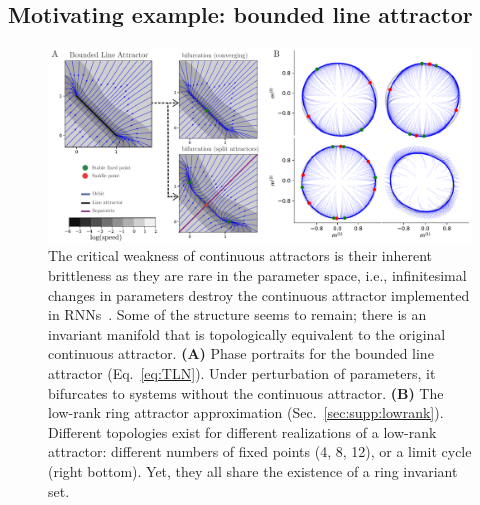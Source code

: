 \documentclass{article} %
\newcounter{ct}
\theoremstyle{definition}
\theoremstyle{remark}
\begin{document}
\subsection{Motivating example: bounded line attractor}\label{sec:motivating:line}
\begin{figure}[tbhp]
  \centering
  \includegraphics[width=.9\textwidth]{lara_bifurcations_s}
  \caption{The critical weakness of continuous attractors is their inherent brittleness as they are rare in the parameter space, i.e., infinitesimal changes in parameters destroy the continuous attractor implemented in RNNs~\cite{seung1996,Renart2003}.
  Some of the structure seems to remain; there is an invariant manifold that is topologically equivalent to the original continuous attractor.
    \textbf{(A)} Phase portraits for the bounded line attractor (Eq.~\eqref{eq:TLN}).
    Under perturbation of parameters, it bifurcates to systems without the continuous attractor.
    \textbf{(B)} The low-rank ring attractor approximation (Sec.~\eqref{sec:supp:lowrank}).
    Different topologies exist for different realizations of a low-rank attractor: different numbers of fixed points (4, 8, 12), or a limit cycle (right bottom).
    Yet, they all share the existence of a ring invariant set.
}\label{fig:lara_bifurcations}
\end{figure}

\setlength{\floatsep}{3pt plus 1pt minus 1pt}
\setlength{\textfloatsep}{3pt plus 1pt minus 1pt}
\end{document}
